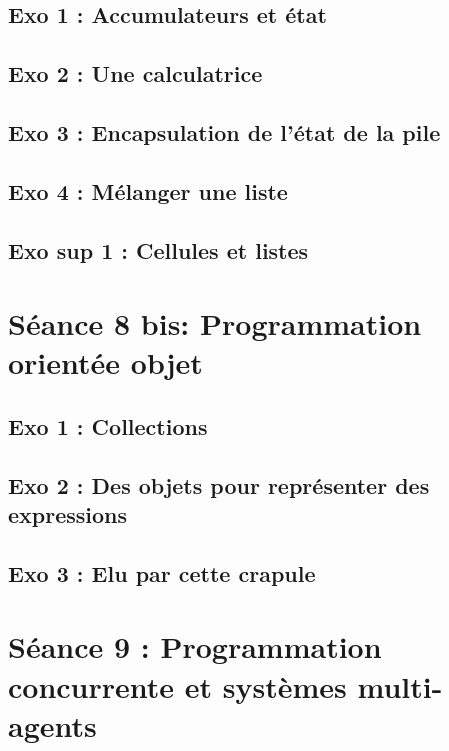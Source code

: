 \subsection{Exo 1 : Accumulateurs et état}


\subsection{Exo 2 : Une calculatrice}


\subsection{Exo 3 : Encapsulation de l'état de la pile}


\subsection{Exo 4 : Mélanger une liste}


\subsection{Exo sup 1 : Cellules et listes}



\newpage
\section{Séance 8 bis: Programmation orientée objet}
\subsection{Exo 1 : Collections}


\subsection{Exo 2 : Des objets pour représenter des expressions}


\subsection{Exo 3 : Elu par cette crapule}



\newpage
\section{Séance 9 : Programmation concurrente et systèmes multi-agents}
